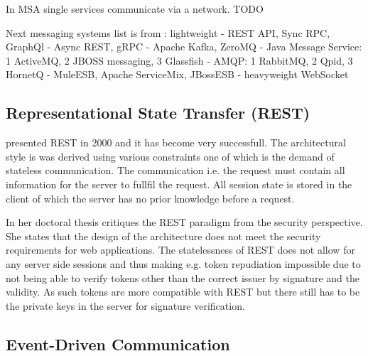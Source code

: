 \begin{sloppypar}
    In MSA single services communicate via a network.
    TODO

    Next messaging systems list is from \citep{secchalmsa}:
lightweight
-
    REST API,
    Sync RPC,
    GraphQl
    -
    Async REST,
    gRPC
    - 
    Apache Kafka,
    ZeroMQ
    -
    Java Message Service:
    1 ActiveMQ,
    2 JBOSS messaging,
    3 Glassfish
    -
    AMQP:
    1 RabbitMQ,
    2 Qpid,
    3 HornetQ
    -
    MuleESB,
    Apache ServiceMix,
    JBossESB
-
heavyweight
    WebSocket
\end{sloppypar}

\subsection{Representational State Transfer (REST)}
\begin{sloppypar}
    \citet{restroy} presented REST in 2000 and it has become very successfull. 
    The architectural style is was derived using various constraints one of 
    which is the demand of stateless communication. The communication i.e. 
    the request must contain all information for the server to fullfil the request. 
    All session state is stored in the client of which the server has no prior 
    knowledge before a request.
\end{sloppypar}
\begin{sloppypar}
    In her doctoral thesis \citet{secchalmsa} critiques the REST paradigm from 
    the security perspective. She states that the design of the architecture 
    does not meet the security requirements for web applications. The 
    statelessness of REST does not allow for any server side sessions and thus 
    making e.g. token repudiation impossible due to not being able to verify 
    tokens other than the correct issuer by signature and the validity. As such 
    tokens are more compatible with REST but there still has to be the private 
    keys in the server for signature verification.
\end{sloppypar}

\subsection{Event-Driven Communication}
\begin{sloppypar}
\end{sloppypar}

